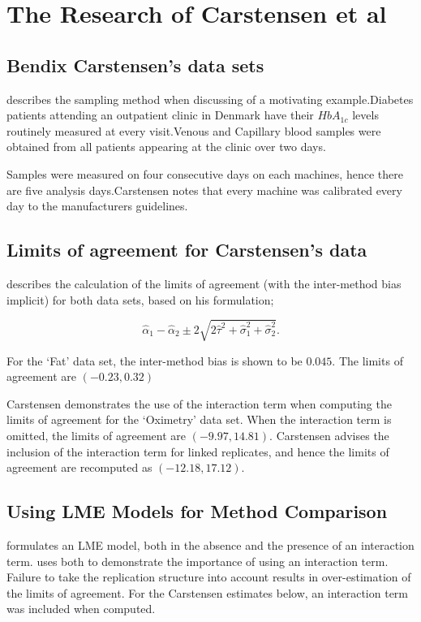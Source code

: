 \documentclass{report}
\begin{document}
\newpage
\section{The Research of Carstensen et al}
\subsection{Bendix Carstensen's data sets}
\citet{bxc2008}describes the sampling method when discussing of a motivating example.Diabetes patients attending an outpatient clinic in Denmark have their $HbA_{1c}$ levels routinely measured at every visit.Venous and Capillary blood samples were obtained from all patients appearing at the clinic over two days.

Samples were measured on four consecutive days on each machines, hence there are five analysis days.Carstensen notes that every machine was calibrated every day to  the manufacturers guidelines.


\subsection{Limits of agreement for Carstensen's data}


\citet{bxc2008} describes the calculation of the limits of agreement (with the inter-method bias implicit) for both data sets, based on his formulation;

\[\hat{\alpha}_1 - \hat{\alpha}_2 \pm 2\sqrt{2\hat{\tau}^2 +\hat{\sigma}_1^2 +\hat{\sigma}_2^2 }.\]

For the `Fat' data set, the inter-method bias is shown to be $0.045$. The limits of agreement are $(-0.23 , 0.32)$

Carstensen demonstrates the use of the interaction term when computing the limits of agreement for the `Oximetry' data set. When the interaction term is omitted, the limits of agreement are $(-9.97, 14.81)$. Carstensen advises the inclusion of the interaction term for linked replicates, and hence the limits of agreement are recomputed as $(-12.18,17.12)$.

\subsection{Using LME Models for Method Comparison}
\citet{bxc2008} formulates an LME model, both in the absence and the presence of an interaction term.\citet{bxc} uses both to demonstrate the importance of using an interaction term. Failure to take the replication structure into
account results in over-estimation of the limits of agreement. For the Carstensen estimates below, an interaction term was included when computed.
\end{document}
